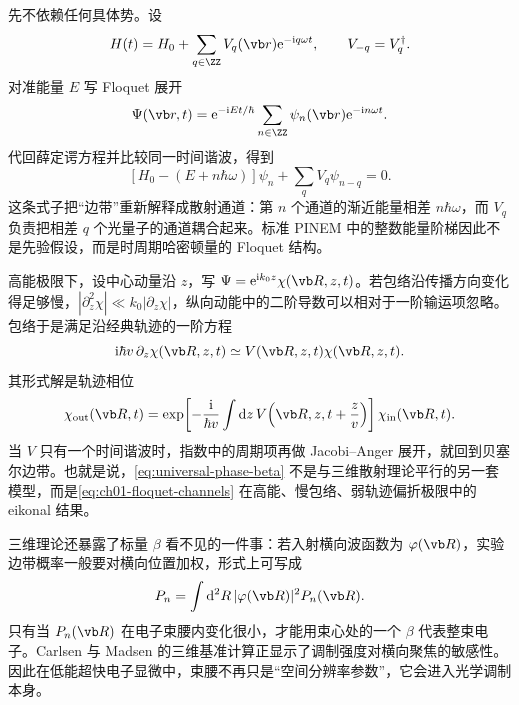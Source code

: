 先不依赖任何具体势。设
\begin{equation}
H(t)=H_0+\sum_{q\in\ZZ}V_q(\vb r)\ee^{-\ii q\omega t},
\qquad V_{-q}=V_q^\dagger .
\label{eq:ch01-floquet-hamiltonian}
\end{equation}
对准能量 $E$ 写 Floquet 展开
\begin{equation}
\Psi(\vb r,t)=\ee^{-\ii Et/\hbar}\sum_{n\in\ZZ}\psi_n(\vb r)\ee^{-\ii n\omega t}.
\label{eq:ch01-floquet-ansatz}
\end{equation}
代回薛定谔方程并比较同一时间谐波，得到
\begin{equation}
\left[H_0-(E+n\hbar\omega)\right]\psi_n
+\sum_q V_q\psi_{n-q}=0.
\label{eq:ch01-floquet-channels}
\end{equation}
这条式子把“边带”重新解释成散射通道：第 $n$ 个通道的渐近能量相差 $n\hbar\omega$，而 $V_q$ 负责把相差 $q$ 个光量子的通道耦合起来。标准 PINEM 中的整数能量阶梯因此不是先验假设，而是时周期哈密顿量的 Floquet 结构。

高能极限下，设中心动量沿 $z$，写 $\Psi=\ee^{\ii k_0z}\chi(\vb R,z,t)$。若包络沿传播方向变化得足够慢，$|\partial_z^2\chi|\ll k_0|\partial_z\chi|$，纵向动能中的二阶导数可以相对于一阶输运项忽略。包络于是满足沿经典轨迹的一阶方程
\begin{equation}
\ii\hbar v\,\partial_z\chi(\vb R,z,t)
\simeq V(\vb R,z,t)\chi(\vb R,z,t).
\label{eq:ch01-eikonal-transport}
\end{equation}
其形式解是轨迹相位
\begin{equation}
\chi_{\rm out}(\vb R,t)
=\exp\!\left[-\frac{\ii}{\hbar v}\int \dd z\,V\!\left(\vb R,z,t+\frac{z}{v}\right)\right]\chi_{\rm in}(\vb R,t).
\label{eq:ch01-eikonal-phase}
\end{equation}
当 $V$ 只有一个时间谐波时，指数中的周期项再做 Jacobi--Anger 展开，就回到贝塞尔边带。也就是说，\cref{eq:universal-phase-beta} 不是与三维散射理论平行的另一套模型，而是\cref{eq:ch01-floquet-channels} 在高能、慢包络、弱轨迹偏折极限中的 eikonal 结果。

三维理论还暴露了标量 $\beta$ 看不见的一件事：若入射横向波函数为 $\varphi(\vb R)$，实验边带概率一般要对横向位置加权，形式上可写成
\begin{equation}
P_n=\int \dd ^2R\,|\varphi(\vb R)|^2 P_n(\vb R).
\label{eq:ch01-transverse-average}
\end{equation}
只有当 $P_n(\vb R)$ 在电子束腰内变化很小，才能用束心处的一个 $\beta$ 代表整束电子。Carlsen 与 Madsen 的三维基准计算正显示了调制强度对横向聚焦的敏感性。因此在低能超快电子显微中，束腰不再只是“空间分辨率参数”，它会进入光学调制本身。

